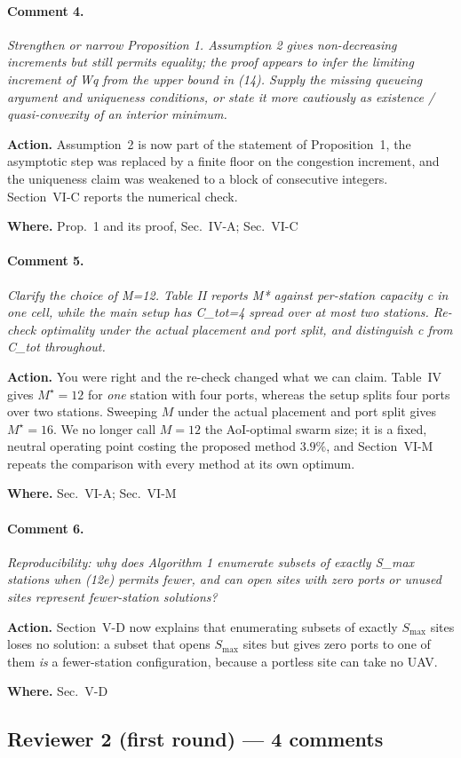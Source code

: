 \documentclass[10pt]{article}
\newcommand{\rev}[1]{\par\medskip\noindent\textit{#1}\par\smallskip}
\newcommand{\act}[2]{\noindent\textbf{Action.} #1\par\noindent\textbf{Where.} #2\par}
\begin{document}
\paragraph{Comment 4.}
\rev{Strengthen or narrow Proposition 1. Assumption 2 gives non-decreasing increments but still permits equality; the proof appears to infer the limiting increment of Wq from the upper bound in (14). Supply the missing queueing argument and uniqueness conditions, or state it more cautiously as existence / quasi-convexity of an interior minimum.}
\act{Assumption~2 is now part of the statement of Proposition~1, the asymptotic step was replaced by a finite floor on the congestion increment, and the uniqueness claim was weakened to a block of consecutive integers. Section~VI-C reports the numerical check.}{Prop.~1 and its proof, Sec.~IV-A; Sec.~VI-C}

\paragraph{Comment 5.}
\rev{Clarify the choice of M=12. Table II reports M* against per-station capacity c in one cell, while the main setup has C\_tot=4 spread over at most two stations. Re-check optimality under the actual placement and port split, and distinguish c from C\_tot throughout.}
\act{You were right and the re-check changed what we can claim. Table~IV gives $M^\star{=}12$ for \emph{one} station with four ports, whereas the setup splits four ports over two stations. Sweeping $M$ under the actual placement and port split gives $M^\star{=}16$. We no longer call $M{=}12$ the AoI-optimal swarm size; it is a fixed, neutral operating point costing the proposed method $3.9\%$, and Section~VI-M repeats the comparison with every method at its own optimum.}{Sec.~VI-A; Sec.~VI-M}

\paragraph{Comment 6.}
\rev{Reproducibility: why does Algorithm 1 enumerate subsets of exactly S\_max stations when (12e) permits fewer, and can open sites with zero ports or unused sites represent fewer-station solutions?}
\act{Section~V-D now explains that enumerating subsets of exactly $S_{\max}$ sites loses no solution: a subset that opens $S_{\max}$ sites but gives zero ports to one of them \emph{is} a fewer-station configuration, because a portless site can take no UAV.}{Sec.~V-D}

\subsection*{Reviewer 2 (first round) --- 4 comments}
\end{document}
